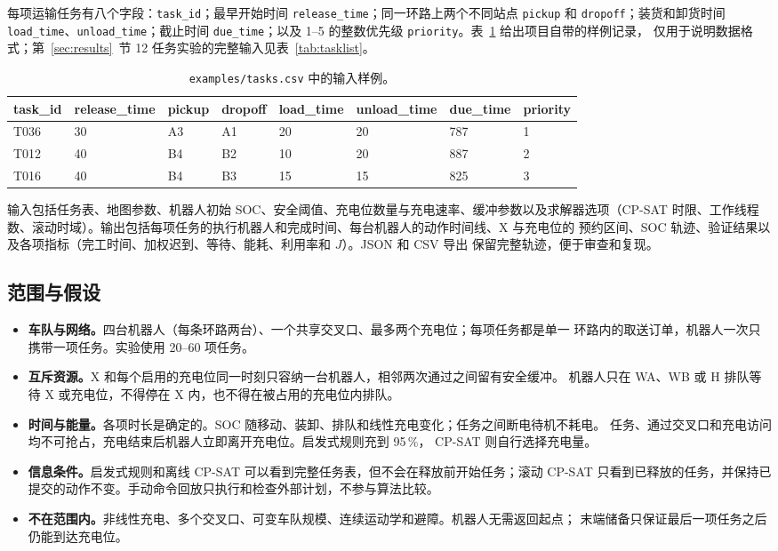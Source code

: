 \documentclass[11pt,a4paper,fontset=none]{ctexart}
\newcommand{\code}[1]{\texttt{#1}}
\newcommand{\pct}{\,\%}
\begin{document}
每项运输任务有八个字段：\code{task\_id}；最早开始时间 \code{release\_time}；同一环路上两个不同站点
\code{pickup} 和 \code{dropoff}；装货和卸货时间 \code{load\_time}、\code{unload\_time}；截止时间
\code{due\_time}；以及 1--5 的整数优先级 \code{priority}。表~\ref{tab:sample} 给出项目自带的样例记录，
仅用于说明数据格式；第~\ref{sec:results}~节 12 任务实验的完整输入见表~\ref{tab:tasklist}。

\begin{table}[!htbp]
\centering\small
\caption{\code{examples/tasks.csv} 中的输入样例。}
\label{tab:sample}
\begin{tabular}{llllllll}
\toprule
task\_id & release\_time & pickup & dropoff & load\_time & unload\_time & due\_time & priority \\
\midrule
T036 & 30 & A3 & A1 & 20 & 20 & 787 & 1 \\
T012 & 40 & B4 & B2 & 10 & 20 & 887 & 2 \\
T016 & 40 & B4 & B3 & 15 & 15 & 825 & 3 \\
\bottomrule
\end{tabular}
\end{table}

输入包括任务表、地图参数、机器人初始 SOC、安全阈值、充电位数量与充电速率、缓冲参数以及求解器选项（CP-SAT
时限、工作线程数、滚动时域）。输出包括每项任务的执行机器人和完成时间、每台机器人的动作时间线、X 与充电位的
预约区间、SOC 轨迹、验证结果以及各项指标（完工时间、加权迟到、等待、能耗、利用率和 $J$）。JSON 和 CSV 导出
保留完整轨迹，便于审查和复现。

\subsection{范围与假设}
\label{sec:scope}

\begin{itemize}
\item \textbf{车队与网络。}四台机器人（每条环路两台）、一个共享交叉口、最多两个充电位；每项任务都是单一
  环路内的取送订单，机器人一次只携带一项任务。实验使用 20--60 项任务。
\item \textbf{互斥资源。}X 和每个启用的充电位同一时刻只容纳一台机器人，相邻两次通过之间留有安全缓冲。
  机器人只在 WA、WB 或 H 排队等待 X 或充电位，不得停在 X 内，也不得在被占用的充电位内排队。
\item \textbf{时间与能量。}各项时长是确定的。SOC 随移动、装卸、排队和线性充电变化；任务之间断电待机不耗电。
  任务、通过交叉口和充电访问均不可抢占，充电结束后机器人立即离开充电位。启发式规则充到 95\pct，
  CP-SAT 则自行选择充电量。
\item \textbf{信息条件。}启发式规则和离线 CP-SAT 可以看到完整任务表，但不会在释放前开始任务；滚动 CP-SAT
  只看到已释放的任务，并保持已提交的动作不变。手动命令回放只执行和检查外部计划，不参与算法比较。
\item \textbf{不在范围内。}非线性充电、多个交叉口、可变车队规模、连续运动学和避障。机器人无需返回起点；
  末端储备只保证最后一项任务之后仍能到达充电位。
\end{itemize}
\end{document}
